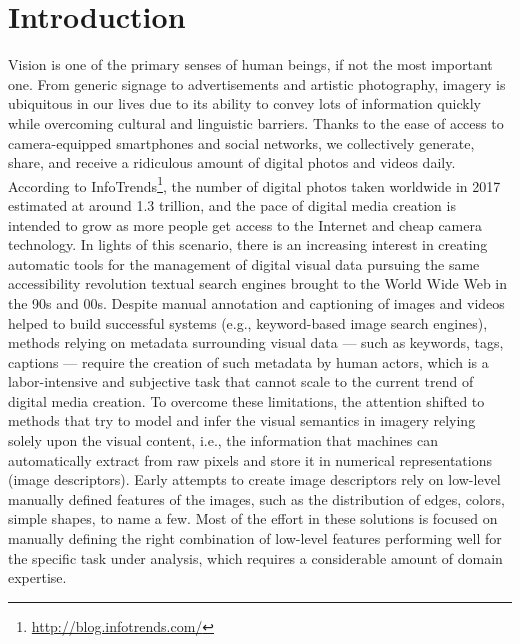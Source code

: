 
\chapter{Introduction}
\label{ch:introduction}

Vision is one of the primary senses of human beings, if not the most important one.
From generic signage to advertisements and artistic photography, imagery is ubiquitous in our lives due to its ability to convey lots of information quickly while overcoming cultural and linguistic barriers.
Thanks to the ease of access to camera-equipped smartphones and social networks, we collectively generate, share, and receive a ridiculous amount of digital photos and videos daily.
According to InfoTrends\footnote{\url{http://blog.infotrends.com/}}, the number of digital photos taken worldwide in 2017 estimated at around 1.3 trillion, and the pace of digital media creation is intended to grow as more people get access to the Internet and cheap camera technology.
In lights of this scenario, there is an increasing interest in creating automatic tools for the management of digital visual data pursuing the same accessibility revolution textual search engines brought to the World Wide Web in the 90s and 00s.
Despite manual annotation and captioning of images and videos helped to build successful systems (e.g., keyword-based image search engines), methods relying on metadata surrounding visual data --- such as keywords, tags, captions --- require the creation of such metadata by human actors, which is a labor-intensive and subjective task that cannot scale to the current trend of digital media creation.
To overcome these limitations, the attention shifted to methods that try to model and infer the visual semantics in imagery relying solely upon the visual content, i.e., the information that machines can automatically extract from raw pixels and store it in numerical representations (image descriptors).
Early attempts to create image descriptors rely on low-level manually defined features of the images, such as the distribution of edges, colors, simple shapes, to name a few.
Most of the effort in these solutions is focused on manually defining the right combination of low-level features performing well for the specific task under analysis, which requires a considerable amount of domain expertise.

